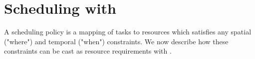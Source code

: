 \section{Scheduling with \name{}}
\label{policies}

%




A scheduling policy is a mapping of tasks to resources which satisfies any spatial ("where") and temporal ("when") constraints.
We now describe how these constraints can be cast as resource requirements with \name{}. %


